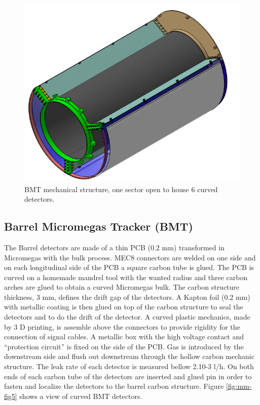 \begin{figure}[htb]
 \includegraphics[width=1.0\columnwidth,keepaspectratio]{images/fig3}
 \caption{BMT mechanical structure, one sector open to house 6 curved detectors.}
 \label{fig:mm-fig3}
\end{figure}


\subsection{Barrel Micromegas Tracker (BMT)}

The Barrel detectors are made of a thin PCB (0.2 mm) transformed in Micromegas with the bulk process. MEC8 connectors are welded on one side and on each longitudinal side of the PCB a square carbon tube is glued. The PCB is curved on a homemade mandrel tool with the wanted radius and three carbon arches are glued to obtain a curved Micromegas bulk. The carbon structure thickness, 3 mm, defines the drift gap of the detectors. A Kapton foil (0.2 mm) with metallic coating is then glued on top of the carbon structure to seal the detectors and to do the drift of the detector. A curved plastic mechanics, made by 3 D printing, is assemble above the connectors to provide rigidity for the connection of signal cables. A metallic box with the high voltage contact and “protection circuit” is fixed on the side of the PCB.  Gas is introduced by the downstream side and flush out downstream through the hollow carbon mechanic structure. The leak rate of each detector is measured bellow 2.10-3 l/h.  On both ends of each carbon tube of the detectors are inserted and glued pin in order to fasten and localize the detectors to the barrel carbon structure. Figure \ref{fig:mm-fig5} shows a view of curved BMT detectors.

